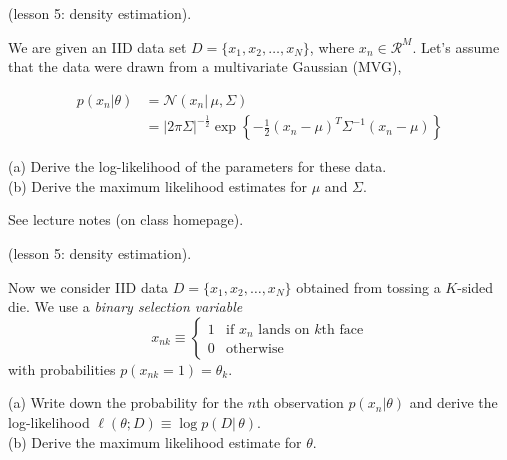 \documentclass[a4paper]{article}
\newcommand{\N}{\mathcal{N}}
\newcommand{\mc}[1]{\mathcal{#1}}
\begin{document}
\begin{ExerciseList}





\Exercise[label={ex:ML-MVG}] (lesson 5: density estimation). 

 We are given an IID data set $D = \{x_1,x_2,\ldots,x_N\}$, where $x_n \in \mc{R}^M$. Let's assume that the data were drawn from a multivariate Gaussian (MVG),

    \begin{align*}
p(x_n|\theta) &= \N(x_n|\,\mu,\Sigma) \\
    &= |2 \pi \Sigma|^{-\frac{1}{2}} \exp\left\{-\frac{1}{2}(x_n-\mu)^T
\Sigma^{-1} (x_n-\mu) \right\}
\end{align*}

(a) Derive the log-likelihood of the parameters for these data.\\

(b) Derive the maximum likelihood estimates for $\mu$ and $\Sigma$.



\Answer[ref={ex:ML-MVG}]

See lecture notes (on class homepage).


\Exercise[label={ex:ML-Mult}] (lesson 5: density estimation). 

Now we consider IID data $D = \{x_1,x_2,\ldots,x_N\}$ obtained from tossing a $K$-sided die. We use a \emph{binary selection variable}
$$x_{nk} \equiv \begin{cases} 1 & \text{if $x_n$ lands on $k$th face}\\
    0 & \text{otherwise}
\end{cases}
$$
with probabilities $p(x_{nk} = 1)=\theta_k$.
 
(a) Write down the probability for the $n$th observation $p(x_n|\theta)$ and derive the log-likelihood $\ell(\theta;D)\equiv \log p(D|\,\theta)$.\\

(b) Derive the maximum likelihood estimate for $\theta$.



\end{ExerciseList}
\end{document}
